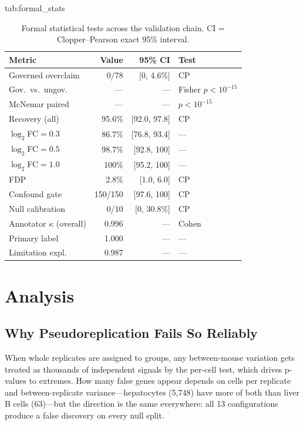 \documentclass[pmlr,twocolumn,10pt]{jmlr}
\begin{document}
\begin{table}[htbp]
\floatconts
  {tab:formal_stats}
  {\caption{Formal statistical tests across the validation chain.
  CI = Clopper--Pearson exact 95\% interval.}}
  {\footnotesize
  \begin{tabular}{@{}lrrl@{}}
  \toprule
  \textbf{Metric} & \textbf{Value} & \textbf{95\% CI} & \textbf{Test} \\
  \midrule
  Governed overclaim & 0/78 & [0, 4.6\%] & CP \\
  Gov.\ vs.\ ungov.\ & --- & --- & Fisher $p{<}10^{-15}$ \\
  McNemar paired & --- & --- & $p{<}10^{-15}$ \\
  \midrule
  Recovery (all) & 95.6\% & [92.0, 97.8] & CP \\
  \quad $\log_2$FC${=}0.3$ & 86.7\% & [76.8, 93.4] & --- \\
  \quad $\log_2$FC${=}0.5$ & 98.7\% & [92.8, 100] & --- \\
  \quad $\log_2$FC${=}1.0$ & 100\% & [95.2, 100] & --- \\
  FDP & 2.8\% & [1.0, 6.0] & CP \\
  \midrule
  Confound gate & 150/150 & [97.6, 100] & CP \\
  Null calibration & 0/10 & [0, 30.8\%] & CP \\
  \midrule
  Annotator $\kappa$ (overall) & 0.996 & --- & Cohen \\
  \quad Primary label & 1.000 & --- & --- \\
  \quad Limitation expl. & 0.987 & --- & --- \\
  \bottomrule
  \end{tabular}}
\end{table}

\section{Analysis}

\subsection{Why Pseudoreplication Fails So Reliably}

When whole replicates are assigned to groups, any between-mouse variation gets treated as thousands of independent signals by the per-cell test, which drives p-values to extremes. How many false genes appear depends on cells per replicate and between-replicate variance---hepatocytes (5{,}748) have more of both than liver B cells (63)---but the direction is the same everywhere: all 13 configurations produce a false discovery on every null split.
\end{document}
